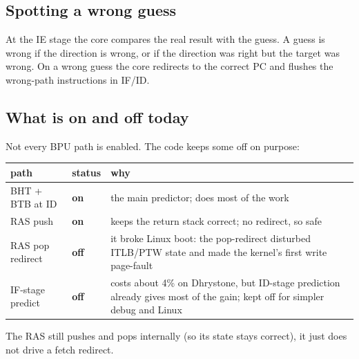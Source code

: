 \subsection{Spotting a wrong guess}
At the IE stage the core compares the real result with the guess. A guess is
wrong if the direction is wrong, or if the direction was right but the target was
wrong. On a wrong guess the core redirects to the correct PC and flushes the
wrong-path instructions in IF/ID.

\subsection{What is on and off today}
Not every BPU path is enabled. The code keeps some off on purpose:
\begin{center}\small
\begin{tabularx}{\textwidth}{l l Y}
\toprule
\textbf{path} & \textbf{status} & \textbf{why} \\
\midrule
BHT + BTB at ID & \textbf{on}  & the main predictor; does most of the work \\
RAS push        & \textbf{on}  & keeps the return stack correct; no redirect, so safe \\
RAS pop redirect& \textbf{off} & it broke Linux boot: the pop-redirect disturbed ITLB/PTW state and made the kernel's first  write page-fault \\
IF-stage predict& \textbf{off} & costs about 4\% on Dhrystone, but ID-stage prediction already gives most of the gain; kept off for simpler debug and Linux \\
\bottomrule
\end{tabularx}
\end{center}
The RAS still pushes and pops internally (so its state stays correct), it just
does not drive a fetch redirect.
